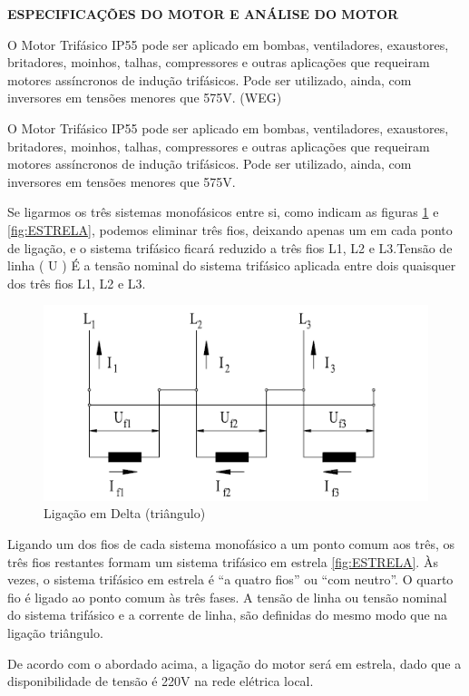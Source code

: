 \textbf{ESPECIFICAÇÕES DO MOTOR E ANÁLISE DO MOTOR}

O Motor Trifásico IP55 pode ser aplicado em bombas, ventiladores, exaustores, britadores, moinhos, talhas, compressores e outras aplicações que requeiram motores assíncronos de indução trifásicos. Pode ser utilizado, ainda, com inversores em tensões menores que 575V. (WEG)

O Motor Trifásico IP55 pode ser aplicado em bombas, ventiladores, exaustores, britadores, moinhos, talhas, compressores e outras aplicações que requeiram motores assíncronos de indução trifásicos. Pode ser utilizado, ainda, com inversores em tensões menores que 575V.

Se ligarmos os três sistemas monofásicos entre si, como indicam as figuras \ref{fig:TRIANGULO} e \ref{fig:ESTRELA}, podemos eliminar três fios, deixando apenas um em cada ponto de ligação, e o sistema trifásico ficará reduzido a três fios L1, L2 e L3.Tensão de linha ( U ) É a tensão nominal do sistema trifásico aplicada entre dois quaisquer dos
três fios L1, L2 e L3.

\begin{figure}[!ht]
\centering
\includegraphics[scale=0.8]{figuras/TRIANGULO.png}
\caption{Ligação em Delta (triângulo)}
\label{fig:TRIANGULO}
\end{figure}

Ligando um dos fios de cada sistema monofásico a um ponto comum aos três, os três fios restantes formam um sistema trifásico em estrela \ref{fig:ESTRELA}. Às vezes, o sistema trifásico em estrela é “a quatro fios” ou “com neutro”. O quarto fio é ligado ao ponto comum às três fases. A tensão de linha ou tensão nominal do sistema trifásico e a corrente de linha, são definidas do mesmo modo que na ligação triângulo.

De acordo com o abordado acima, a ligação do motor será em estrela, dado que a disponibilidade de tensão é 220V na rede elétrica local.

